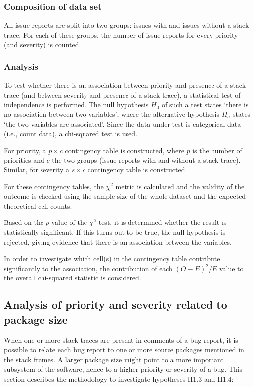 \vspace{\baselineskip}
\hypaa{}

\vspace{\baselineskip}
\hypab{}

\vspace{\baselineskip}

\subsubsection{Composition of data set}
All issue reports are split into two groups: issues with and issues without a stack trace. For each of these groups, the number of issue reports for every priority (and severity) is counted.

\subsubsection{Analysis}
To test whether there is an association between priority and presence of a stack trace (and between severity and presence of a stack trace), a statistical test of independence is performed. The null hypothesis $H_0$ of such a test states `there is no association between two variables', where the alternative hypothesis $H_a$ states `the two variables are associated'. Since the data under test is categorical data (i.e., count data), a chi-squared test is used.

For priority, a $p \times c$ contingency table is constructed, where $p$ is the number of priorities and $c$ the two groups (issue reports with and without a stack trace). Similar, for severity a $s \times c$ contingency table is constructed.

For these contingency tables, the $\chi^2$ metric is calculated and the validity of the outcome is checked using the sample size of the whole dataset and the expected theoretical cell counts.

Based on the $p$-value of the $\chi^2$ test, it is determined whether the result is statistically significant. If this turns out to be true, the null hypothesis is rejected, giving evidence that there is an association between the variables.

In order to investigate which cell(s) in the contingency table contribute significantly to the association, the contribution of each $(O-E)^2/E$ value to the overall chi-squared statistic is considered. 

\subsection{Analysis of priority and severity related to package size} %
\label{sub:da:analysis_of_priority_and_severity_related_to_package_size}
When one or more stack traces are present in comments of a bug report, it is possible to relate each bug report to one or more source packages mentioned in the stack frames. A larger package size might point to a more important subsystem of the software, hence to a higher priority or severity of a bug. This section describes the methodology to investigate hypotheses H1.3 and H1.4:

